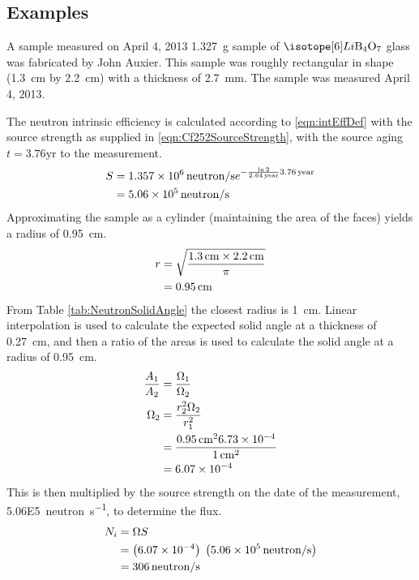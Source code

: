 \documentclass[draftcls,onecolumn]{IEEEtran}
\begin{document}
\subsection{Examples}
\begin{Exercise*}[label={LiBorateGlass},title={Li borate glass},name={Example}]
A sample measured on April 4, 2013 \SI{1.327}{\g} sample of $\iso[6]{Li}\text{B}_4\text{O}_7$ glass was fabricated by John Auxier.
This sample was roughly rectangular in shape (\SI{1.3}{\cm} by \SI{2.2}{\cm}) with a thickness of \SI{2.7}{\mm}.
The sample was measured April 4, 2013.

The neutron intrinsic efficiency is calculated according to \eqref{eqn:intEffDef} with the source strength as supplied in \eqref{eqn:Cf252SourceStrength}, with the source aging $t = 3.76 \text{yr}$ to the measurement.
\begin{align}
    S &= \SI{1.357E6}{neutron\per\second} e^{-\frac{ \ln{2}}{\SI{2.64}{year}}\SI{3.76}{year}} \\ \notag
      &= \SI{5.06E5}{neutron\per\second}
\end{align}
Approximating the sample as a cylinder (maintaining the area of the faces) yields a radius of \SI{0.95}{\cm}.
\begin{align}
	r &= \sqrt{\frac{\SI{1.3}{\cm} \times \SI{2.2}{\cm}}{\pi}} \\ \notag
	& = \SI{0.95}{\cm}
\end{align}
From Table \ref{tab:NeutronSolidAngle} the closest radius is \SI{1}{\cm}.
Linear interpolation is used to calculate the expected solid angle at a thickness of \SI{0.27}{\cm}, and then a ratio of the areas is used to calculate the solid angle at a radius of \SI{0.95}{\cm}.
\begin{align*}
	\frac{A_1}{A_2} &= \frac{\Omega_1}{\Omega_2} \\ 
	\Omega_2 &= \frac{r_2^2 \Omega_2}{r_1^2} \\
	 &= \frac{\SI{0.95}{\cm}^2 \num{6.73E-4}}{\SI{1}{\cm}^2}\\
	 &= \num{6.07E-4}
\end{align*}
This is then multiplied by the source strength on the date of the measurement, \SI{5.06E5}{neutron\per\second}, to determine the flux.
\begin{align*}
 	N_i &= \Omega S \\
	 &= \left (\num{6.07E-4}\right) \;\left( \SI{5.06E5}{neutron\per\second}\right) \\
   &= \SI{306}{neutron\per\second}
\end{align*}


\end{Exercise*}
\end{document}
